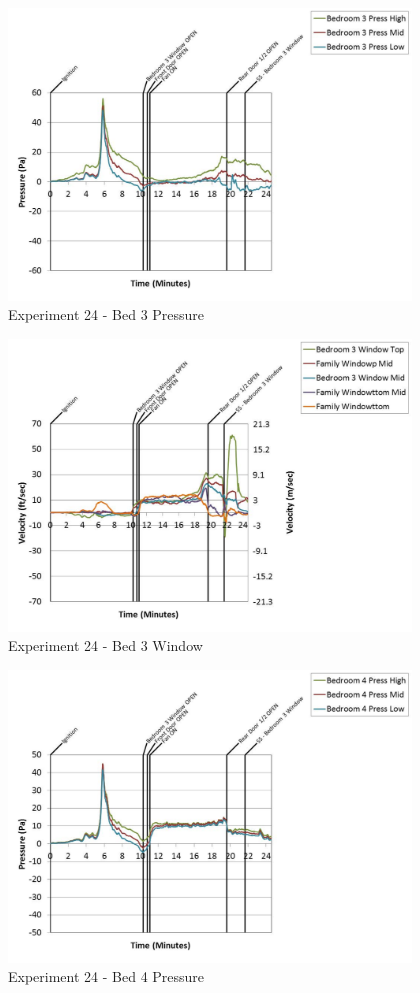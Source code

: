 \documentclass{article}
\begin{document}
\begin{appendices}
	\begin{figure}[h!]
		\centering
		\includegraphics[height=3.05in]{0_Images/Results_Charts/Exp_24_Charts/Bed3Pressure.pdf}
		\caption{Experiment 24 - Bed 3 Pressure}
	\end{figure}
 
	\clearpage

	\begin{figure}[h!]
		\centering
		\includegraphics[height=3.05in]{0_Images/Results_Charts/Exp_24_Charts/Bed3Window.pdf}
		\caption{Experiment 24 - Bed 3 Window}
	\end{figure}
 

	\begin{figure}[h!]
		\centering
		\includegraphics[height=3.05in]{0_Images/Results_Charts/Exp_24_Charts/Bed4Pressure.pdf}
		\caption{Experiment 24 - Bed 4 Pressure}
	\end{figure}
 

\end{appendices}
\end{document}

